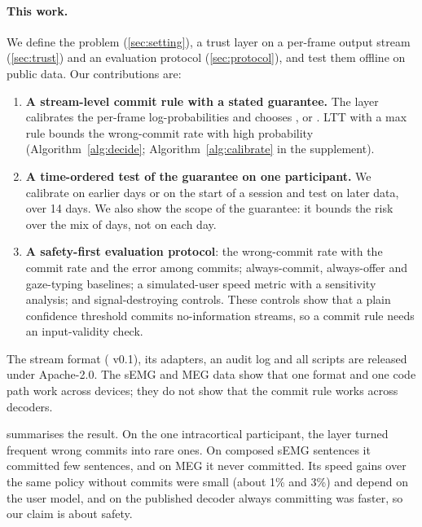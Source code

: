 \paragraph{This work.} We define the problem (\cref{sec:setting}), a trust layer on a per-frame output stream (\cref{sec:trust}) and an evaluation protocol (\cref{sec:protocol}), and test them offline on public data. Our contributions are:
\begin{enumerate}[leftmargin=*,itemsep=1pt]
  \item \textbf{A stream-level commit rule with a stated guarantee.} The layer calibrates the per-frame log-probabilities and chooses ,  or . LTT with a max rule bounds the wrong-commit rate with high probability (Algorithm~\ref{alg:decide}; Algorithm~\ref{alg:calibrate} in the supplement).
  \item \textbf{A time-ordered test of the guarantee on one participant.} We calibrate on earlier days or on the start of a session and test on later data, over 14 days. We also show the scope of the guarantee: it bounds the risk over the mix of days, not on each day.
  \item \textbf{A safety-first evaluation protocol}: the wrong-commit rate with the commit rate and the error among commits; always-commit, always-offer and gaze-typing baselines; a simulated-user speed metric with a sensitivity analysis; and signal-destroying controls. These controls show that a plain confidence threshold commits no-information streams, so a commit rule needs an input-validity check.
\end{enumerate}
The stream format (\nts{} v0.1), its adapters, an audit log and all scripts are released under Apache-2.0. The sEMG and MEG data show that one format and one code path work across devices; they do not show that the commit rule works across decoders.

 summarises the result. On the one intracortical participant, the layer turned frequent wrong commits into rare ones. On composed sEMG sentences it committed few sentences, and on MEG it never committed. Its speed gains over the same policy without commits were small (about 1\% and 3\%) and depend on the user model, and on the published decoder always committing was faster, so our claim is about safety.

